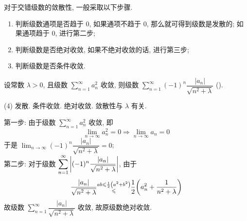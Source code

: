 对于交错级数的敛散性, 一般采取以下步骤.
\begin{enumerate}[label=(\arabic{*})]
    \item 判断级数通项是否趋于 0, 如果通项不趋于 0, 那么就可得到级数是发散的; 如果通项趋于 0, 进行第二步;
    \item 判断级数是否绝对收敛, 如果不绝对收敛的话, 进行第三步;
    \item 判断级数是否条件收敛.
\end{enumerate}

\begin{example}
    设常数 $\lambda>0$, 且级数 $\displaystyle \sum_{n=1}^{\infty} a_n^2$ 收敛, 则级数 $ \displaystyle \sum_{n=1}^{\infty} (-1)^{n}\dfrac{|a_n|}{\sqrt{n^2+\lambda}} $ (\quad).
    \begin{tasks}(4)
        \task 发散.
        \task 条件收敛.
        \task 绝对收敛.
        \task 敛散性与 $\lambda$ 有关.
    \end{tasks}
\end{example}
\begin{solution}
    第一步: 由于级数 $\displaystyle \sum_{n=1}^{\infty} a_n^2$ 收敛, 即
    $$
        \lim_{n \to \infty}a_n^2=0\Rightarrow \lim_{n \to \infty}a_n=0
    $$
    于是 $ \displaystyle \lim_{n \to \infty}(-1)^n\dfrac{|a_n|}{\sqrt{n^2+\lambda}} =0$; \\
    第二步: 对于级数 $ \displaystyle \sum_{n=1}^{\infty} \qty|(-1)^{n}\dfrac{|a_n|}{\sqrt{n^2+\lambda}}| $, 由于
    $$
        \dfrac{|a_n|}{\sqrt{n^2+\lambda}}\substack{ab\leqslant \frac{1}{2}\qty(a^2+b^2)\\ \leqslant }\dfrac{1}{2}\qty(a_n^2+\dfrac{1}{n^2+\lambda})
    $$
    故级数 $\displaystyle \sum_{n=1}^{\infty} \dfrac{|a_n|}{\sqrt{n^2+\lambda}}$ 收敛, 故原级数绝对收敛.
\end{solution}

